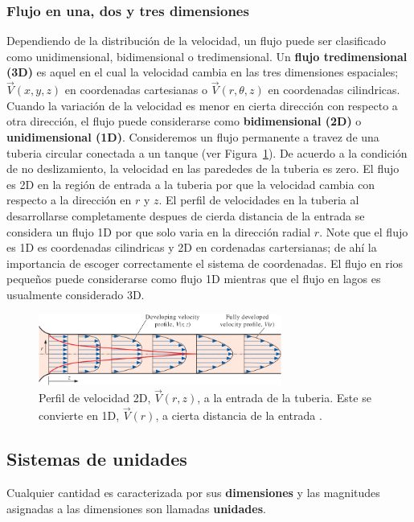 \documentclass[10pt, oneside]{article}
\begin{document}
\subsubsection{Flujo en una, dos y tres dimensiones}
Dependiendo de la distribuci\'on de la velocidad, un flujo puede ser clasificado como unidimensional, bidimensional o tredimensional. Un \textbf{flujo tredimensional (3D)} es aquel en el cual la velocidad cambia en las tres dimensiones espaciales; $\vec{V}(x,y,z)$ en coordenadas cartesianas o $\vec{V}(r,\theta,z)$ en coordenadas cilindricas. Cuando la variaci\'on de la velocidad es menor en cierta direcci\'on con respecto a otra direcci\'on, el flujo puede considerarse como \textbf{bidimensional (2D)} o \textbf{unidimensional (1D)}.
Consideremos un flujo permanente a travez de una tuberia circular conectada a un tanque (ver Figura~\ref{flowd}). De acuerdo a la condici\'on de no deslizamiento, la velocidad en las parededes de la tuberia es zero. El flujo es 2D en la regi\'on de entrada a la tuberia por que la velocidad cambia con respecto a la direcci\'on en $r$ y $z$. El perfil de velocidades en la tuberia al desarrollarse completamente despues de cierda distancia de la entrada se considera un flujo 1D por que solo varia en la direcci\'on radial $r$. Note que el flujo es 1D es coordenadas cilindricas y 2D en cordenadas cartersianas; de ah\'i la importancia de escoger correctamente el sistema de coordenadas. El flujo en rios peque\~nos puede considerarse como flujo 1D mientras que el flujo en lagos es usualmente considerado 3D.

\begin{figure}[h]
\centering
\includegraphics[width=8cm]{flowd}
\caption{Perfil de velocidad 2D, $\vec{V}(r,z)$, a la entrada de la tuberia. Este se convierte en 1D, $\vec{V}(r)$, a  cierta distancia de la entrada \cite{this}.}
\label{flowd}
\end{figure}


\subsection{Sistemas de unidades}
Cualquier cantidad es caracterizada por sus \textbf{dimensiones} y las magnitudes asignadas a las dimensiones son llamadas \textbf{unidades}.
\end{document}
